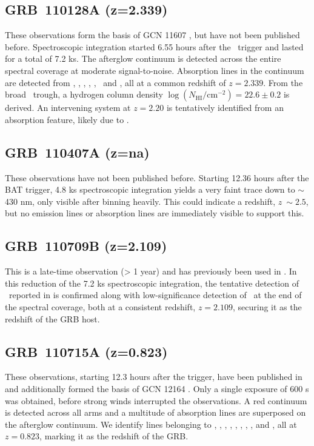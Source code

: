 \documentclass[longauth]{aa}    %
\begin{document}
\subsection{GRB~110128A (z=2.339)} \label{110128}

These observations form the basis of GCN 11607 \citep{GCN11607}, but have not
been published before. Spectroscopic integration started 6.55 hours after the
\swift~trigger and lasted for a total of 7.2 ks. The afterglow continuum is
detected across the entire spectral coverage at moderate signal-to-noise.
Absorption lines in the continuum are detected from \lya, \oi, \cii, \SIiv, \civ,
\SIii~and \feii, all at a common redshift of $z=2.339$. From the broad
\lya~trough, a hydrogen column density $\log (N_{\mathrm{HI}}/\mathrm{cm}^{-2})
= 22.6 \pm 0.2$ is derived. An intervening system at $z=2.20$ is tentatively
identified from an absorption feature, likely due to \civ.

\subsection{GRB~110407A (z=na)} \label{110407}

These observations have not been published before. Starting 12.36 hours after
the BAT trigger, 4.8 ks spectroscopic integration yields a very faint trace down
to $\sim$430 nm, only visible after binning heavily. This could indicate a
redshift, $z ~\sim 2.5$, but no emission lines or absorption lines are
immediately visible to support this.

\subsection{GRB~110709B (z=2.109)} \label{110709}

This is a late-time observation (> 1 year) and has previously been used in
\citet{Perley2016a}. In this reduction of the 7.2 ks spectroscopic integration,
the tentative detection of \oiii~reported in \citet{Perley2016a} is confirmed
along with low-significance detection of \ha~at the end of the spectral
coverage, both at a consistent redshift, $z=2.109$, securing it as the redshift
of the GRB host.


\subsection{GRB~110715A (z=0.823)} \label{110715}

These observations, starting 12.3 hours after the trigger, have been published
in \citet{Sanchez-Ramirez2017} and additionally formed the basis of GCN 12164
\citep{GCN12164}. Only a single exposure of 600 s was obtained, before strong
winds interrupted the observations. A red continuum is detected across all arms
and a multitude of absorption lines are superposed on the afterglow continuum.
We identify lines belonging to \alii, \aliii, \znii, \crii, \feii, \mgii, \mgi,
\caii, and \caii, all at  $z=0.823$, marking it as the redshift of the GRB.
\end{document}
